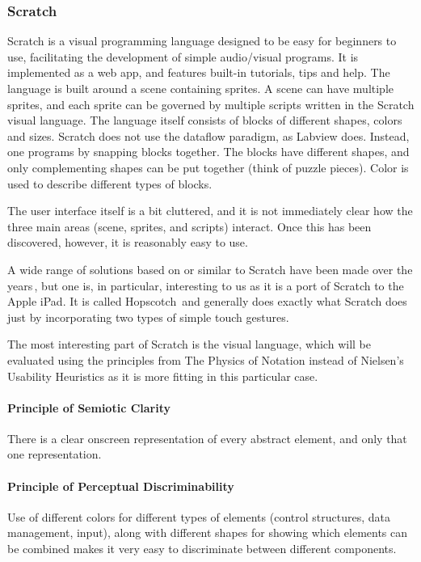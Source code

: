 \subsubsection{Scratch}
Scratch is a visual programming language designed to be easy for beginners to use, facilitating the development of simple audio/visual programs. It is implemented as a web app, and features built-in tutorials, tips and help.
The language is built around a scene containing sprites. A scene can have multiple sprites, and each sprite can be governed by multiple scripts written in the Scratch visual language. The language itself consists of blocks of different shapes, colors and sizes. Scratch does not use the dataflow paradigm, as Labview does. Instead, one programs by snapping blocks together. The blocks have different shapes, and only complementing shapes can be put together (think of puzzle pieces). Color is used to describe different types of blocks.

The user interface itself is a bit cluttered, and it is not immediately clear how the three main areas (scene, sprites, and scripts) interact. Once this has been discovered, however, it is reasonably easy to use. 

A wide range of solutions based on or similar to Scratch have been made over the years\,\cite{hosick2014}, but one is, in particular, interesting to us as it is a port of Scratch to the Apple iPad. It is called Hopscotch\,\cite{hopscotch} and generally does exactly what Scratch does just by incorporating two types of simple touch gestures.

The most interesting part of Scratch is the visual language, which will be evaluated using the principles from The Physics of Notation  instead of Nielsen's Usability Heuristics as it is more fitting in this particular case.

\paragraph{Principle of Semiotic Clarity}
There is a clear onscreen representation of every abstract element, and only that one representation.

\paragraph{Principle of Perceptual Discriminability}
Use of different colors for different types of elements (control structures, data management, input), along with different shapes for showing which elements can be combined makes it very easy to discriminate between different components.

